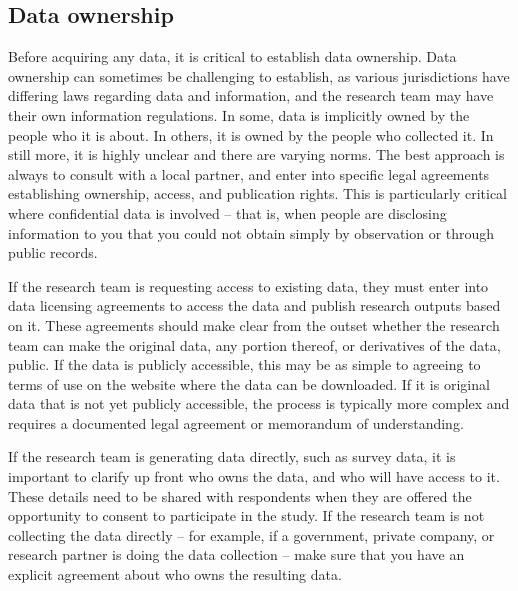\subsection{Data ownership}
Before acquiring any data, it is critical to establish data ownership.
Data ownership
can sometimes be challenging to establish,
as various jurisdictions have differing laws regarding data and information,
and the research team may have their own information regulations.
In some, data is implicitly owned by the people who it is about.
In others, it is owned by the people who collected it.
In still more, it is highly unclear and there are varying norms.
The best approach is always to consult with a local partner,
and enter into specific legal agreements establishing ownership,
access, and publication rights.
This is particularly critical where confidential data is involved
-- that is, when people are disclosing information to you
that you could not obtain simply by observation or through public records.

If the research team is requesting access to existing data, 
they must enter into data licensing agreements
to access the data and publish research outputs based on it.
These agreements should make clear from the outset whether the
research team can make the original data, any portion thereof, or derivatives
of the data, public.
If the data is publicly accessible, 
this may be as simple to agreeing to terms of use on the website where the data can be downloaded. 
If it is original data that is not yet publicly accessible, 
the process is typically more complex and requires a documented legal agreement or memorandum of understanding.

If the research team is generating data directly, such as survey data,
it is important to clarify up front who owns the data,
and who will have access to it.
These details need to be shared with respondents when they are offered the opportunity
to consent to participate in the study.
If the research team is not collecting the data directly --
for example, if a government, private company, or research partner is doing the data collection --
make sure that you have an explicit agreement
about who owns the resulting data.

